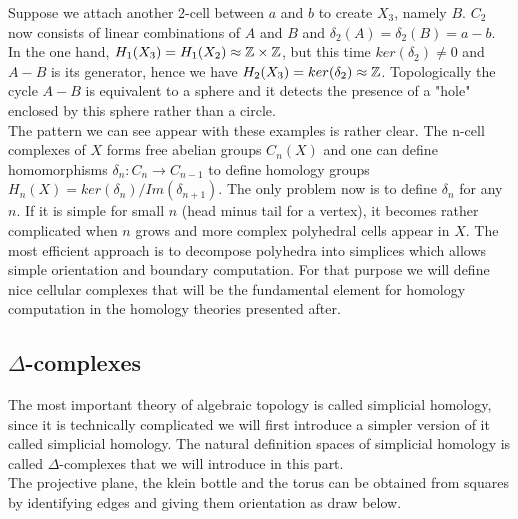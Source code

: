 \documentclass[12pt]{article}
\begin{document}
Suppose we attach another 2-cell between $a$ and $b$ to create $X_3$, namely $B$. $C_2$ now consists of linear combinations of $A$ and $B$ and $\delta_2(A) = \delta_2(B) = a-b$. In the one hand, $H_1(X_3) = H_1(X_2) \approx \mathbb{Z} \times \mathbb{Z}$, but this time $ker(\delta_2) \neq 0$ and $A-B$ is its generator, hence we have $H_2(X_3) = ker(\delta_2) \approx \mathbb{Z}$. Topologically the cycle $A-B$ is equivalent to a sphere and it detects the presence of a "hole" enclosed by this sphere rather than a circle.\\

The pattern we can see appear with these examples is rather clear. The n-cell complexes of $X$ forms free abelian groups $C_n(X)$ and one can define homomorphisms $\delta_n: C_n \to C_{n-1}$ to define homology groups $H_n(X) = ker(\delta_n)/Im(\delta_{n+1})$. The only problem now is to define $\delta_n$ for any $n$. If it is simple for small $n$ (head minus tail for a vertex), it becomes rather complicated when $n$ grows and more complex polyhedral cells appear in $X$. The most efficient approach is to decompose polyhedra into simplices which allows simple orientation and boundary computation. For that purpose we will define nice cellular complexes that will be the fundamental element for homology computation in the homology theories presented after. 

\subsection{$\Delta$-complexes}

The most important theory of algebraic topology is called simplicial homology, since it is technically complicated we will first introduce a simpler version of it called simplicial homology. The natural definition spaces of simplicial homology is called $\Delta$-complexes that we will introduce in this part.\\

The projective plane, the klein bottle and the torus can be obtained from squares by identifying edges and giving them orientation as draw below.
\end{document}
